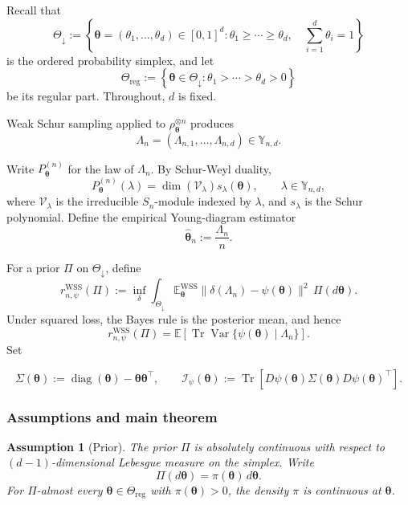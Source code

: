 \documentclass{article}
\newtheorem{assumption}[theorem]{Assumption}
\theoremstyle{named}
\theoremstyle{named1}
\newcommand{\E}{\mathbb{E}}
\newcommand{\Tr}{\operatorname{Tr}}
\newcommand{\Var}{\operatorname{Var}}
\newcommand{\diag}{\operatorname{diag}}
\newcommand{\WSS}{\mathrm{WSS}}
\newcommand{\btheta}{\boldsymbol{\theta}}
\newcommand{\cI}{\mathcal{I}}
\newcommand{\cV}{\mathcal V}
\theoremstyle{plain}
\theoremstyle{remark}
\begin{document}
Recall that
\[
    \Theta_{\downarrow}
    :=\left\{
      \btheta=(\theta_1,\ldots,\theta_d)\in[0,1]^d:
      \theta_1\geq\cdots\geq\theta_d,\quad
      \sum_{i=1}^d\theta_i=1
    \right\}
\]
is the ordered probability simplex, and let
\[
    \Theta_{\mathrm{reg}}
    :=\left\{
      \btheta\in\Theta_{\downarrow}:
      \theta_1>\cdots>\theta_d>0
    \right\}
\]
be its regular part. Throughout, \(d\) is fixed.

Weak Schur sampling applied to $\rho_{\btheta}^{\otimes n}$ produces
\[
    \Lambda_n=(\Lambda_{n,1},\ldots,\Lambda_{n,d})
    \in\mathbb Y_{n,d}.
\]

Write \(P_{\btheta}^{(n)}\) for the law of \(\Lambda_n\). By
Schur-Weyl duality,
\begin{equation}
    P_{\btheta}^{(n)}(\lambda)
    =\dim(\cV_\lambda)s_\lambda(\btheta),
    \qquad \lambda\in\mathbb Y_{n,d},
\label{eq:wss-law-bayes}
\end{equation}
where \(\cV_\lambda\) is the irreducible \(S_n\)-module indexed by
\(\lambda\), and \(s_\lambda\) is the Schur polynomial. Define the
empirical Young-diagram estimator
\[
    \widehat{\btheta}_n:=\frac{\Lambda_n}{n}.
\]


For a prior \(\Pi\) on \(\Theta_{\downarrow}\), define
\[
    r_{n,\psi}^{\WSS}(\Pi)
    :=\inf_\delta
      \int_{\Theta_{\downarrow}}
      \E_{\btheta}^{\WSS}
      \|\delta(\Lambda_n)-\psi(\btheta)\|^2
      \,\Pi(d\btheta).
\]
Under squared loss, the Bayes rule is the posterior mean, and hence
\[
    r_{n,\psi}^{\WSS}(\Pi)
    =\E\!\left[\Tr\Var\{\psi(\btheta)\mid\Lambda_n\}\right].
\]
Set

\begin{equation}
    \Sigma(\btheta)
      :=\diag(\btheta)-\btheta\btheta^\top, \qquad 
    \cI_\psi(\btheta)
      :=\Tr\!\left[
        D\psi(\btheta)\Sigma(\btheta)D\psi(\btheta)^\top
      \right].\label{eq:wss-risk-constant}
\end{equation}



\subsubsection{Assumptions and main theorem}

\begin{assumption}[Prior]
\label{ass:prior}
The prior \(\Pi\) is absolutely continuous with respect to
\((d-1)\)-dimensional Lebesgue measure on the simplex. Write
\[
    \Pi(d\btheta)=\pi(\btheta)\,d\btheta.
\]
For \(\Pi\)-almost every \(\btheta\in\Theta_{\mathrm{reg}}\) with
\(\pi(\btheta)>0\), the density \(\pi\) is continuous at \(\btheta\).
\end{assumption}
\end{document}

